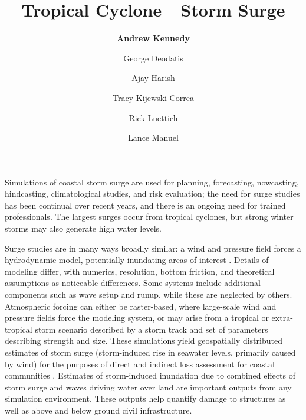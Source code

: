 %
%
%

\title{Tropical Cyclone---Storm Surge}
\author{
    \textbf{Andrew Kennedy}
    \and George Deodatis
    \and Ajay Harish
    \and Tracy Kijewski-Correa
    \and Rick Luettich
    \and Lance Manuel}
\tocauthor{}
%
%
\maketitle

Simulations of coastal storm surge are used for planning, forecasting, nowcasting, hindcasting, climatological studies, and risk evaluation; the need for surge studies has been continual over recent years, and there is an ongoing need for trained professionals. The largest surges occur from tropical cyclones, but strong winter storms may also generate high water levels.

Surge studies are in many ways broadly similar: a wind and pressure field forces a hydrodynamic model, potentially inundating areas of interest \citep{njcoast2018implementation}. Details of modeling differ, with numerics, resolution, bottom friction, and theoretical assumptions as noticeable differences. Some systems include additional components such as wave setup and runup, while these are neglected by others. Atmospheric forcing can either be raster-based, where large-scale wind and pressure fields force the modeling system, or may arise from a tropical or extra-tropical storm scenario described by a storm track and set of parameters describing strength and size. These simulations yield geospatially distributed estimates of storm surge (storm-induced rise in seawater levels, primarily caused by wind) for the purposes of direct and indirect loss assessment for coastal communities \citep{jacob2011responding}. Estimates of storm-induced inundation due to combined effects of storm surge and waves driving water over land are important outputs from any simulation environment. These outputs help quantify damage to structures as well as above and below ground civil infrastructure.

